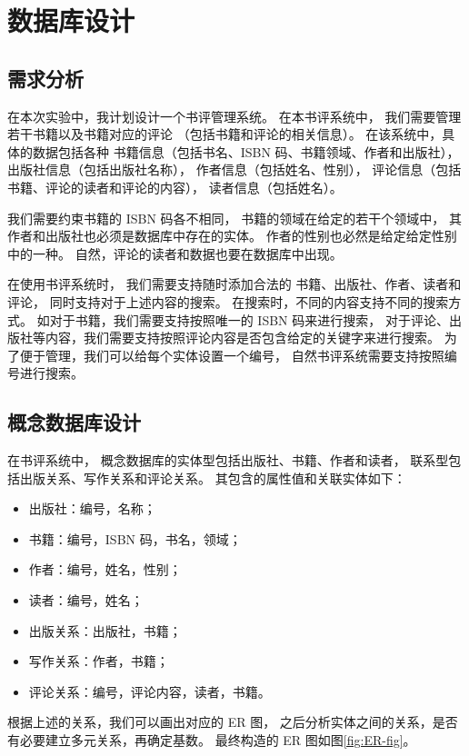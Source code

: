\documentclass[12pt,onecolumn]{report}
\theoremstyle{plain}
\numberwithin{figure}{chapter}
\numberwithin{table}{chapter}
\numberwithin{lstlisting}{chapter}
\begin{document}
\chapter{数据库设计}
\section{需求分析}
在本次实验中，我计划设计一个书评管理系统。
在本书评系统中，
我们需要管理若干书籍以及书籍对应的评论
（包括书籍和评论的相关信息）。
在该系统中，具体的数据包括各种
书籍信息（包括书名、ISBN 码、书籍领域、作者和出版社），
出版社信息（包括出版社名称），
作者信息（包括姓名、性别），
评论信息（包括书籍、评论的读者和评论的内容），
读者信息（包括姓名）。

我们需要约束书籍的 ISBN 码各不相同，
书籍的领域在给定的若干个领域中，
其作者和出版社也必须是数据库中存在的实体。
作者的性别也必然是给定给定性别中的一种。
自然，评论的读者和数据也要在数据库中出现。

在使用书评系统时，
我们需要支持随时添加合法的
书籍、出版社、作者、读者和评论，
同时支持对于上述内容的搜索。
在搜索时，不同的内容支持不同的搜索方式。
如对于书籍，我们需要支持按照唯一的 ISBN 码来进行搜索，
对于评论、出版社等内容，我们需要支持按照评论内容是否包含给定的关键字来进行搜索。
为了便于管理，我们可以给每个实体设置一个编号，
自然书评系统需要支持按照编号进行搜索。

\section{概念数据库设计}

在书评系统中，
概念数据库的实体型包括出版社、书籍、作者和读者，
联系型包括出版关系、写作关系和评论关系。
其包含的属性值和关联实体如下：
\begin{itemize}[fullwidth,itemindent=\parindent]
\item 出版社：编号，名称；
\item 书籍：编号，ISBN 码，书名，领域；
\item 作者：编号，姓名，性别；
\item 读者：编号，姓名；
\item 出版关系：出版社，书籍；
\item 写作关系：作者，书籍；
\item 评论关系：编号，评论内容，读者，书籍。
\end{itemize}

根据上述的关系，我们可以画出对应的 ER 图，
之后分析实体之间的关系，是否有必要建立多元关系，再确定基数。
最终构造的 ER 图如图\ref{fig:ER-fig}。
\end{document}
